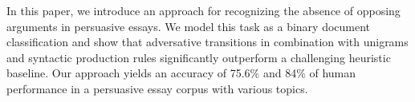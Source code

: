 In this paper, we introduce an approach for recognizing the absence of opposing arguments in persuasive essays. We model this task as a binary document classification and show that adversative transitions in combination with unigrams and syntactic production rules significantly outperform a challenging heuristic baseline. Our approach yields an accuracy of 75.6\% and 84\% of human performance in a persuasive essay corpus with various topics.
